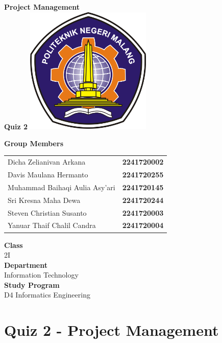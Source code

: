 \documentclass[12pt,titlepage]{article}
\newcommand{\vSubject}{Project Management}
\newcommand{\vSubtitle}{Quiz 2}
\newcommand{\vClass}{2I}
\newcommand{\vDepartment}{Information Technology}
\newcommand{\vStudyProgram}{D4 Informatics Engineering}
\begin{document}
\begin{titlepage}
    \centering
    \vfill
    {\bfseries\LARGE
        \vSubject\\
        \vskip0.25cm
        \vSubtitle
    }
    \vfill
    \includegraphics[width=6cm]{images/polinema-logo.png}
    \vfill
    {
        \textbf{Group Members}\\
        \vspace{0.5cm}
        \begin{tabular}{l l}
            Dicha Zelianivan Arkana         & \textbf{2241720002} \\
            Davis Maulana Hermanto          & \textbf{2241720255} \\
            Muhammad Baihaqi Aulia Asy'ari  & \textbf{2241720145} \\
            Sri Kresna Maha Dewa            & \textbf{2241720244} \\
            Steven Christian Susanto        & \textbf{2241720003} \\
            Yanuar Thaif Chalil Candra      & \textbf{2241720004} \\            
        \end{tabular}
        \vskip0.5cm
        \textbf{Class}\\
        \vClass\\
        \vskip0.5cm
        \textbf{Department}\\
        \vDepartment\\
        \vskip0.5cm
        \textbf{Study Program}\\
        \vStudyProgram
    }
\end{titlepage}

\newpage

\section*{Quiz 2 - Project Management}
\end{document}
